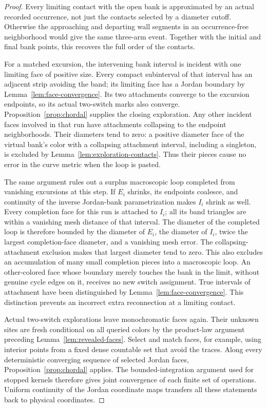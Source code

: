 \begin{proof}
Every limiting contact with the open bank is approximated by
an actual recorded occurrence, not just the contacts selected
by a diameter cutoff.  Otherwise the approaching and departing
wall segments in an occurrence-free neighborhood would give
the same three-arm event.  Together with the initial and final
bank points, this recovers the full order of the contacts.

For a matched excursion, the intervening bank interval is
incident with one limiting face of positive size.  Every
compact subinterval of that interval has an adjacent strip
avoiding the band; its limiting face has a Jordan boundary by
Lemma~\ref{lem:face-convergence}.  Its two attachments converge
to the excursion endpoints, so its actual two-switch marks
also converge.  Proposition~\ref{prop:chordal} supplies the
closing exploration.  Any other incident faces involved in
that run have attachments collapsing to the endpoint
neighborhoods.  Their diameters tend to zero: a positive
diameter face of the virtual bank's color with a collapsing
attachment interval, including a singleton, is excluded by
Lemma~\ref{lem:exploration-contacts}.  Thus their pieces cause
no error in the curve metric when the loop is pasted.

The same argument rules out a surplus macroscopic loop
completed from vanishing excursions at this step.  If $E_i$
shrinks, its endpoints coalesce, and continuity of the inverse
Jordan-bank parametrization makes $I_i$ shrink as well.  Every
completion face for this run is attached to $I_i$; all its band
triangles are within a vanishing mesh distance of that interval.
The diameter of the completed loop is therefore bounded by the
diameter of $E_i$, the diameter of $I_i$, twice the largest
completion-face diameter, and a vanishing mesh error.  The
collapsing-attachment exclusion makes that largest diameter tend
to zero.  This also excludes an accumulation of many small
completion pieces into a macroscopic loop.
An other-colored face whose boundary merely
touches the bank in the limit, without genuine cycle edges
on it, receives no new switch assignment.  True intervals of
attachment have been distinguished by
Lemma~\ref{lem:face-convergence}.  This distinction prevents
an incorrect extra reconnection at a limiting contact.

Actual two-switch explorations leave monochromatic faces
again.  Their unknown sites are fresh conditional on all
queried colors by the product-law argument preceding
Lemma~\ref{lem:revealed-faces}.  Select and match faces, for
example, using interior points from a fixed dense countable
set that avoid the traces.  Along every deterministic
converging sequence of selected Jordan faces,
Proposition~\ref{prop:chordal} applies.  The bounded-integration
argument used for stopped kernels therefore gives joint
convergence of each finite set of operations.  Uniform
continuity of the Jordan coordinate maps transfers all these
statements back to physical coordinates.
\end{proof}

